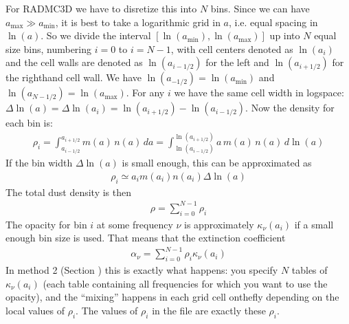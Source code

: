 \documentclass[letterpaper,10pt,english]{sphinxmanual}
\begin{document}
For RADMC\sphinxhyphen{}3D we have to disretize this into \(N\) bins. Since we can have
\(a_{\mathrm{max}}\gg a_{\mathrm{min}}\), it is best to take a logarithmic
grid in \(a\), i.e. equal spacing in \(\ln(a)\).  So we divide the
interval \([\ln(a_{\mathrm{min}}),\ln(a_{\mathrm{max}})]\) up into \(N\)
equal size bins, numbering \(i=0\) to \(i=N-1\), with cell centers
denoted as \(\ln(a_i)\) and the cell walls are denoted as
\(\ln(a_{i-1/2})\) for the left\sphinxhyphen{} and \(\ln(a_{i+1/2})\) for the
right\sphinxhyphen{}hand cell wall. We have \(\ln(a_{-1/2})=\ln(a_{\mathrm{min}})\) and
\(\ln(a_{N-1/2})=\ln(a_{\mathrm{max}})\). For any \(i\) we have the same
cell width in log\sphinxhyphen{}space:
\(\Delta\ln(a)=\Delta\ln(a_i)=\ln(a_{i+1/2})-\ln(a_{i-1/2})\).
Now the density for each bin is:
\begin{equation*}
\begin{split}\rho_i = \int_{a_{i-1/2}}^{a_{i+1/2}} m(a)\,n(a)\,da = \int_{\ln(a_{i-1/2})}^{\ln(a_{i+1/2})} a\,m(a)\,n(a)\,d\ln(a)\end{split}
\end{equation*}
If the bin width \(\Delta\ln(a)\) is small enough, this can be approximated
as
\begin{equation*}
\begin{split}\rho_i \simeq a_i m(a_i)n(a_i)\Delta\ln(a)\end{split}
\end{equation*}
The total dust density is then
\begin{equation*}
\begin{split}\rho = \sum_{i=0}^{N-1} \rho_i\end{split}
\end{equation*}
The opacity for bin \(i\) at some frequency \(\nu\) is approximately \(\kappa_\nu(a_i)\)
if a small enough bin size is used. That means that the extinction coefficient
\begin{equation*}
\begin{split}\alpha_\nu = \sum_{i=0}^{N-1} \rho_i\kappa_\nu(a_i)\end{split}
\end{equation*}
In method 2 (Section {\hyperref[\detokenize{dustradtrans:sec-grain-size-distributions-method-2}]{}}) this is exactly what happens:
you specify \(N\) tables of \(\kappa_\nu(a_i)\) (each table containing all frequencies
for which you want to use the opacity), and the “mixing” happens in each grid cell on\sphinxhyphen{}the\sphinxhyphen{}fly
depending on the local values of \(\rho_i\). The values of \(\rho_i\) in the file
 are exactly these \(\rho_i\).
\end{document}
